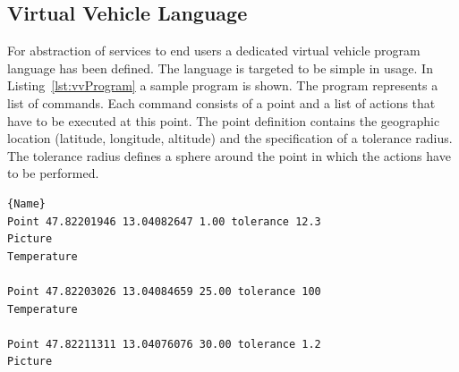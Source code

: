 \subsection{Virtual Vehicle Language}

For abstraction of services to end users a dedicated virtual vehicle program language has been defined. The language is targeted to be simple in usage. In Listing~\ref{lst:vvProgram} a sample program is shown. The program represents a list of commands. Each command consists of a point and a list of actions that have to be executed at this point. The point definition contains the geographic location (latitude, longitude, altitude) and the specification of a tolerance radius. The tolerance radius defines a sphere around the point in which the actions have to be performed.

\begin{lstlisting}[caption={Virtual Vehicle Sample Program},mathescape=true,label=lst:vvProgram]{Name}
Point 47.82201946 13.04082647 1.00 tolerance 12.3
Picture
Temperature

Point 47.82203026 13.04084659 25.00 tolerance 100
Temperature

Point 47.82211311 13.04076076 30.00 tolerance 1.2
Picture
\end{lstlisting}





